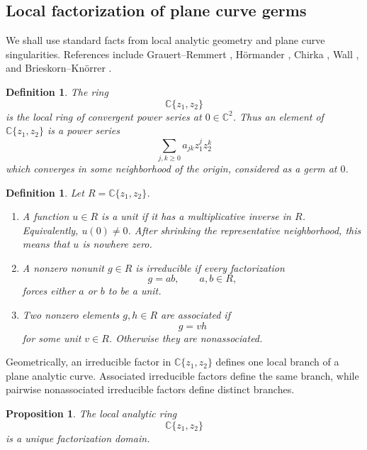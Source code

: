 \documentclass[10pt,a4paper]{amsart}
\newtheorem{proposition}[theorem]{Proposition}
\newtheorem{definition}[theorem]{Definition}
\newcommand{\C}{\mathbb C}
\begin{document}
\subsection{Local factorization of plane curve germs}

We shall use standard facts from local analytic geometry and plane curve
singularities. References include Grauert--Remmert
\cite[Ch.~2]{GrauertRemmert1984}, H\"ormander \cite[Ch.~VI]{Hormander1990},
Chirka \cite{Chirka1989}, Wall \cite[Ch.~2]{Wall2004}, and
Brieskorn--Kn\"orrer \cite[Ch.~8]{BrieskornKnorrer1986}.

\begin{definition}\label{def:convergent-power-series}
The ring
\[
        \C\{z_1,z_2\}
\]
is the local ring of convergent power series at $0\in\C^2$. Thus an
element of $\C\{z_1,z_2\}$ is a power series
\[
        \sum_{j,k\ge0} a_{jk}z_1^jz_2^k
\]
which converges in some neighborhood of the origin, considered as a germ
at $0$.
\end{definition}

\begin{definition}\label{def:unit-irreducible-associated}
Let $R=\C\{z_1,z_2\}$.
\begin{enumerate}
\item A function $u\in R$ is a \emph{unit} if it has a multiplicative
inverse in $R$. Equivalently, $u(0)\ne0$. After shrinking the
representative neighborhood, this means that $u$ is nowhere zero.

\item A nonzero nonunit $g\in R$ is \emph{irreducible} if every
factorization
\[
        g=ab,
        \qquad a,b\in R,
\]
forces either $a$ or $b$ to be a unit.

\item Two nonzero elements $g,h\in R$ are \emph{associated} if
\[
        g=vh
\]
for some unit $v\in R$. Otherwise they are \emph{nonassociated}.
\end{enumerate}
\end{definition}

Geometrically, an irreducible factor in $\C\{z_1,z_2\}$ defines one
local branch of a plane analytic curve. Associated irreducible factors
define the same branch, while pairwise nonassociated irreducible factors
define distinct branches.

\begin{proposition}\label{prop:ufd-convergent-power-series}
The local analytic ring
\[
        \C\{z_1,z_2\}
\]
is a unique factorization domain.
\end{proposition}
\end{document}
